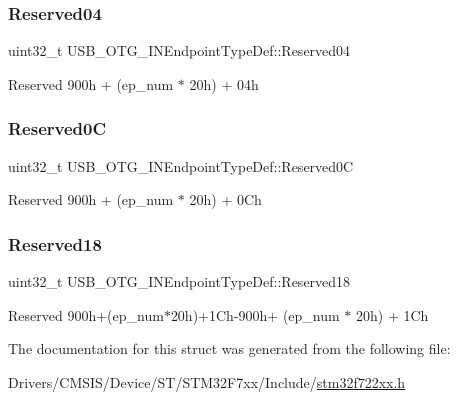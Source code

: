 \subsubsection{\texorpdfstring{Reserved04}{Reserved04}}
{\footnotesize\ttfamily uint32\+\_\+t U\+S\+B\+\_\+\+O\+T\+G\+\_\+\+I\+N\+Endpoint\+Type\+Def\+::\+Reserved04}

Reserved 900h + (ep\+\_\+num $\ast$ 20h) + 04h \mbox{\label{struct_u_s_b___o_t_g___i_n_endpoint_type_def_a30c3ab77aa3174965375dfe1a01bdddb}} 
\subsubsection{\texorpdfstring{Reserved0C}{Reserved0C}}
{\footnotesize\ttfamily uint32\+\_\+t U\+S\+B\+\_\+\+O\+T\+G\+\_\+\+I\+N\+Endpoint\+Type\+Def\+::\+Reserved0C}

Reserved 900h + (ep\+\_\+num $\ast$ 20h) + 0Ch \mbox{\label{struct_u_s_b___o_t_g___i_n_endpoint_type_def_a525d6997cba563967fd7ea22898ed4f6}} 
\subsubsection{\texorpdfstring{Reserved18}{Reserved18}}
{\footnotesize\ttfamily uint32\+\_\+t U\+S\+B\+\_\+\+O\+T\+G\+\_\+\+I\+N\+Endpoint\+Type\+Def\+::\+Reserved18}

Reserved 900h+(ep\+\_\+num$\ast$20h)+1Ch-\/900h+ (ep\+\_\+num $\ast$ 20h) + 1Ch 

The documentation for this struct was generated from the following file\+:\begin{DoxyCompactItemize}
\item 
Drivers/\+C\+M\+S\+I\+S/\+Device/\+S\+T/\+S\+T\+M32\+F7xx/\+Include/\mbox{\hyperlink{stm32f722xx_8h}{stm32f722xx.\+h}}\end{DoxyCompactItemize}
